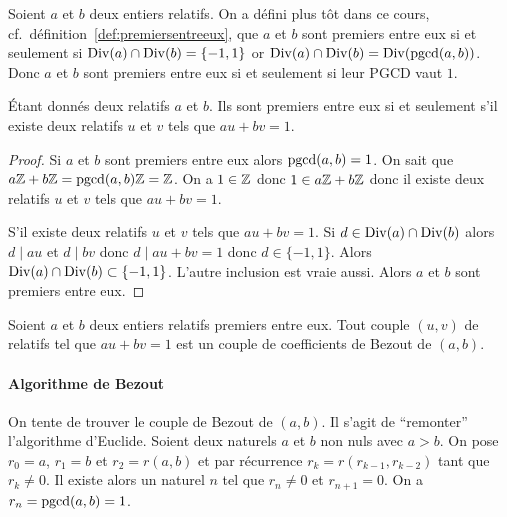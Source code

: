 Soient \(a\) et \(b\) deux entiers relatifs. On a défini plus tôt dans ce cours, cf.\ définition~\ref{def:premiersentreeux}, que \(a\) et \(b\) sont premiers entre eux si et seulement si \(\operatorname{Div}(a) \cap \operatorname{Div}(b)=\{-1,1\}\) or \(\operatorname{Div}(a) \cap \operatorname{Div}(b) = \operatorname{Div}(\operatorname{pgcd}(a,b))\). Donc \(a\) et \(b\) sont premiers entre eux si et seulement si leur PGCD vaut \(1\).

\begin{theo}
  Étant donnés deux relatifs \(a\) et \(b\). Ils sont premiers entre eux si et seulement s'il existe deux relatifs \(u\) et \(v\) tels que \(au+bv=1\).
\end{theo}
\begin{proof}
  Si \(a\) et \(b\) sont premiers entre eux alors \(\operatorname{pgcd}(a,b) =1\). %
  On sait que \(a\mathbb{Z}+b\mathbb{Z}=\operatorname{pgcd}(a,b)\mathbb{Z}=\mathbb{Z}\). On a \(1 \in \mathbb{Z}\) donc \(1 \in a\mathbb{Z}+b\mathbb{Z}\) donc il existe deux relatifs \(u\) et \(v\) tels que \(au+bv=1\).

  S'il existe deux relatifs \(u\) et \(v\) tels que \(au+bv=1\). Si \(d \in \operatorname{Div}(a) \cap \operatorname{Div}(b)\) alors \(d \mid au\) et \(d \mid bv\) donc \(d \mid au+bv=1\) donc \(d \in \{-1,1\}\). Alors \(\operatorname{Div}(a) \cap \operatorname{Div}(b) \subset \{-1,1\}\). L'autre inclusion est vraie aussi. Alors \(a\) et \(b\) sont premiers entre eux.
\end{proof}

\begin{defdef}
  Soient \(a\) et \(b\) deux entiers relatifs premiers entre eux. Tout couple \((u,v)\) de relatifs tel que \(au+bv=1\) est un couple de coefficients de Bezout de \((a,b)\).
\end{defdef}

\paragraph{Algorithme de Bezout}

On tente de trouver le couple de Bezout de \((a,b)\). Il s'agit de ``remonter'' l'algorithme d'Euclide. Soient deux naturels \(a\) et \(b\) non nuls avec \(a>b\). On pose \(r_0=a\), \(r_1=b\) et \(r_2=r(a,b)\) et par récurrence \(r_k=r(r_{k-1}, r_{k-2})\) tant que \(r_k \neq 0\). Il existe alors un naturel \(n\) tel que \(r_n \neq 0\) et \(r_{n+1}=0\). On a \(r_n=\operatorname{pgcd}(a,b)=1\).

